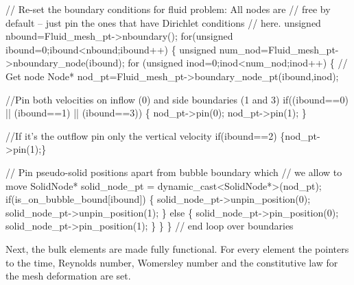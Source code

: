 \begin{DoxyCodeInclude}
 \textcolor{comment}{// Re-set the boundary conditions for fluid problem: All nodes are}
 \textcolor{comment}{// free by default -- just pin the ones that have Dirichlet conditions}
 \textcolor{comment}{// here. }
 \textcolor{keywordtype}{unsigned} nbound=Fluid\_mesh\_pt->nboundary();
 \textcolor{keywordflow}{for}(\textcolor{keywordtype}{unsigned} ibound=0;ibound<nbound;ibound++)
  \{
   \textcolor{keywordtype}{unsigned} num\_nod=Fluid\_mesh\_pt->nboundary\_node(ibound);
   \textcolor{keywordflow}{for} (\textcolor{keywordtype}{unsigned} inod=0;inod<num\_nod;inod++)
    \{
     \textcolor{comment}{// Get node}
     Node* nod\_pt=Fluid\_mesh\_pt->boundary\_node\_pt(ibound,inod);
     
     \textcolor{comment}{//Pin both velocities on inflow (0) and side boundaries (1 and 3)}
     \textcolor{keywordflow}{if}((ibound==0) || (ibound==1) || (ibound==3))
      \{
       nod\_pt->pin(0);
       nod\_pt->pin(1);
      \}
     
     \textcolor{comment}{//If it's the outflow pin only the vertical velocity}
     \textcolor{keywordflow}{if}(ibound==2) \{nod\_pt->pin(1);\}
     
     \textcolor{comment}{// Pin pseudo-solid positions apart from bubble boundary which}
     \textcolor{comment}{// we allow to move}
     SolidNode* solid\_node\_pt = \textcolor{keyword}{dynamic\_cast<}SolidNode*\textcolor{keyword}{>}(nod\_pt);
     \textcolor{keywordflow}{if}(is\_on\_bubble\_bound[ibound])
      \{
       solid\_node\_pt->unpin\_position(0);
       solid\_node\_pt->unpin\_position(1);
      \}
     \textcolor{keywordflow}{else}
      \{
       solid\_node\_pt->pin\_position(0);
       solid\_node\_pt->pin\_position(1);
      \}
    \}
  \} \textcolor{comment}{// end loop over boundaries}

\end{DoxyCodeInclude}


Next, the bulk elements are made fully functional. For every element the pointers to the time, Reynolds number, Womersley number and the constitutive law for the mesh deformation are set.


